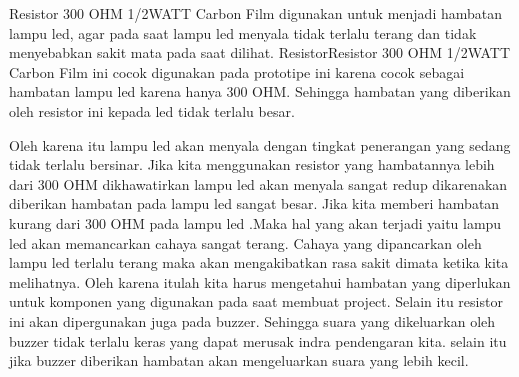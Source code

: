 \begin{enumerate}
\par Resistor 300 OHM 1/2WATT Carbon Film digunakan untuk menjadi hambatan lampu led, agar pada saat lampu led menyala tidak terlalu terang dan tidak menyebabkan sakit mata pada saat dilihat. ResistorResistor 300 OHM 1/2WATT Carbon Film ini cocok digunakan pada prototipe ini karena cocok sebagai hambatan lampu led karena hanya 300 OHM. Sehingga hambatan yang diberikan oleh resistor ini kepada led tidak terlalu besar.
\par Oleh karena itu lampu led akan menyala dengan tingkat penerangan yang sedang tidak terlalu bersinar. Jika kita menggunakan resistor yang hambatannya lebih dari 300 OHM dikhawatirkan lampu led akan menyala sangat redup dikarenakan diberikan hambatan pada lampu led sangat besar. Jika kita memberi hambatan kurang dari 300 OHM pada lampu led .Maka hal yang akan terjadi yaitu lampu led akan memancarkan cahaya sangat terang. Cahaya yang dipancarkan oleh lampu led terlalu terang maka akan mengakibatkan rasa sakit dimata ketika kita melihatnya. Oleh karena itulah kita harus mengetahui hambatan yang diperlukan untuk komponen yang digunakan pada saat membuat project. Selain itu resistor ini akan dipergunakan juga pada buzzer. Sehingga suara yang dikeluarkan oleh buzzer tidak terlalu keras yang dapat merusak indra pendengaran kita. selain itu jika buzzer diberikan hambatan akan mengeluarkan suara yang lebih kecil.


\end{enumerate}
